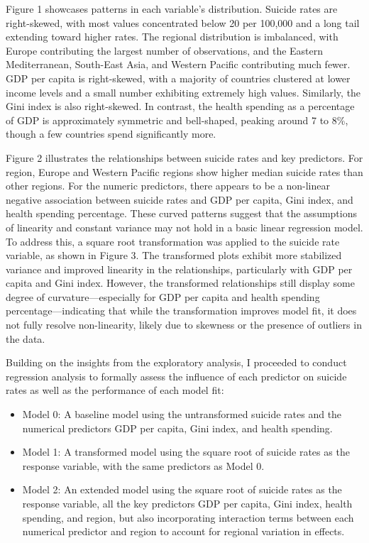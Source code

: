 \documentclass[
]{article}
\begin{document}
Figure 1 showcases patterns in each variable's distribution. Suicide
rates are right-skewed, with most values concentrated below 20 per
100,000 and a long tail extending toward higher rates. The regional
distribution is imbalanced, with Europe contributing the largest number
of observations, and the Eastern Mediterranean, South-East Asia, and
Western Pacific contributing much fewer. GDP per capita is right-skewed,
with a majority of countries clustered at lower income levels and a
small number exhibiting extremely high values. Similarly, the Gini index
is also right-skewed. In contrast, the health spending as a percentage
of GDP is approximately symmetric and bell-shaped, peaking around 7 to
8\%, though a few countries spend significantly more.

Figure 2 illustrates the relationships between suicide rates and key
predictors. For region, Europe and Western Pacific regions show higher
median suicide rates than other regions. For the numeric predictors,
there appears to be a non-linear negative association between suicide
rates and GDP per capita, Gini index, and health spending percentage.
These curved patterns suggest that the assumptions of linearity and
constant variance may not hold in a basic linear regression model. To
address this, a square root transformation was applied to the suicide
rate variable, as shown in Figure 3. The transformed plots exhibit more
stabilized variance and improved linearity in the relationships,
particularly with GDP per capita and Gini index. However, the
transformed relationships still display some degree of
curvature---especially for GDP per capita and health spending
percentage---indicating that while the transformation improves model
fit, it does not fully resolve non-linearity, likely due to skewness or
the presence of outliers in the data.

Building on the insights from the exploratory analysis, I proceeded to
conduct regression analysis to formally assess the influence of each
predictor on suicide rates as well as the performance of each model fit:

\begin{itemize}
\item
  Model 0: A baseline model using the untransformed suicide rates and
  the numerical predictors GDP per capita, Gini index, and health
  spending.
\item
  Model 1: A transformed model using the square root of suicide rates as
  the response variable, with the same predictors as Model 0.
\item
  Model 2: An extended model using the square root of suicide rates as
  the response variable, all the key predictors GDP per capita, Gini
  index, health spending, and region, but also incorporating interaction
  terms between each numerical predictor and region to account for
  regional variation in effects.
\end{itemize}
\end{document}
